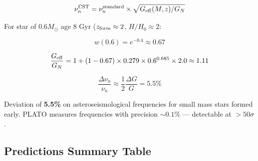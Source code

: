 \documentclass[10pt,a4paper]{article}
\begin{document}
\[\nu_n^{\rm CST} = \nu_n^{\rm standard} \times \sqrt{G_{\rm eff}(M,z)/G_N}\]

For star of \(0.6 M_\odot\) age 8 Gyr (\(z_{\rm form} \approx 2\),
\(H/H_0 \approx 2\):

\[w(0.6) = e^{-0.4} \approx 0.67\]

\[\frac{G_{\rm eff}}{G_N} = 1 + (1-0.67) \times 0.279 \times 0.6^{0.685} \times 2.0 \approx 1.11\]

\[\frac{\Delta\nu_n}{\nu_n} \approx \frac{1}{2}\frac{\Delta G}{G} = 5.5\%\]

Deviation of \textbf{5.5\%} on asteroseismological frequencies for small
mass stars formed early. PLATO measures frequencies with precision
\(\sim 0.1\%\) --- detectable at \(> 50\sigma\).

\subsection{Predictions Summary
Table}\label{predictions-summary-table}
\end{document}

